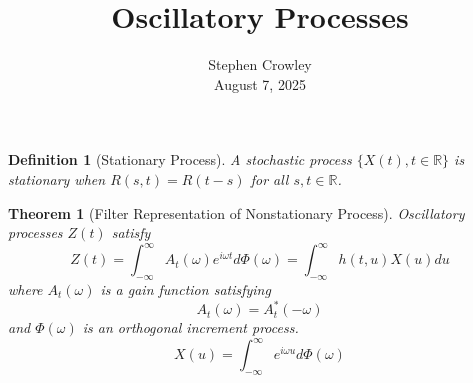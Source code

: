 \documentclass{article}
\newcommand{\tmaffiliation}[1]{\\ #1}
\newtheorem{definition}{Definition}
\newtheorem{theorem}{Theorem}
\begin{document}
\title{Oscillatory Processes}

\author{
  Stephen Crowley
  \tmaffiliation{August 7, 2025}
}

\maketitle

\begin{definition}[Stationary Process]
  A stochastic process $\{X (t), t \in \mathbb{R}\}$ is stationary when $R (s,
  t) = R (t - s)$ for all $s, t \in \mathbb{R}$.
\end{definition}

\begin{theorem}[Filter Representation of Nonstationary Process]
  Oscillatory processes $Z (t)$ satisfy
  \begin{equation}
    Z (t) = \int_{- \infty}^{\infty} A_t (\omega) e^{i \omega t} d \Phi
    (\omega) = \int_{- \infty}^{\infty} h (t, u) X (u) du
  \end{equation}
  where $A_t (\omega)$ is a gain function satisfying
  \begin{equation}
    A_t (\omega) = A_t^{\ast}  (- \omega)
  \end{equation}
  and $\Phi (\omega)$ is an orthogonal increment process.
  \begin{equation}
    X (u) = \int_{- \infty}^{\infty} e^{i \omega u} d \Phi (\omega)
  \end{equation}
\end{theorem}
\end{document}
